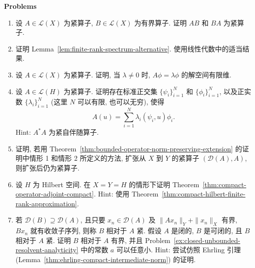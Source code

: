 \textbf{Problems}

\begin{enumerate}[label=\thesection.\arabic*.,ref=\thesection.\arabic*,start=39,series=book-problems]

\item\label{ex:bounded-compact-operator-products} 设 $A\in\mathcal{L}(X)$ 为紧算子, $B\in\mathcal{L}(X)$ 为有界算子. 证明 $AB$ 和 $BA$ 为紧算子.

\item\label{ex:finite-rank-spectrum-alternative-proof} 证明 Lemma~\ref{lem:finite-rank-spectrum-alternative}. 使用线性代数中的适当结果.

\item\label{ex:compact-nonzero-eigenspace-finite-dimensional} 设 $A\in\mathcal{L}(X)$ 为紧算子. 证明, 当 $\lambda\ne0$ 时, $A\phi=\lambda\phi$ 的解空间有限维.

\item\label{ex:compact-operator-singular-system-expansion} 设 $A\in\mathcal{L}(H)$ 为紧算子. 证明存在标准正交集 $\{\psi_i\}_{i=1}^N$ 和 $\{\phi_i\}_{i=1}^N$, 以及正实数 $\{\lambda_i\}_{i=1}^N$ (这里 $N$ 可以有限, 也可以无穷), 使得
\begin{equation}\label{eq:compact-operator-singular-system-problem}
A(u)=\sum_{i=1}^N\lambda_i(\psi_i,u)\phi_i.
\end{equation}
Hint: $A^*A$ 为紧自伴随算子.

\item\label{ex:compact-operator-norm-preserving-extension} 证明, 若用 Theorem~\ref{thm:bounded-operator-norm-preserving-extension} 的证明中情形 1 和情形 2 所定义的方法, 扩张从 $X$ 到 $Y$ 的紧算子 $(\mathcal{D}(A),A)$, 则扩张后仍为紧算子.

\item\label{ex:compact-adjoint-hilbert-proof} 设 $H$ 为 Hilbert 空间. 在 $X=Y=H$ 的情形下证明 Theorem~\ref{thm:compact-operator-adjoint-compact}. Hint: 使用 Theorem~\ref{thm:compact-hilbert-finite-rank-approximation}.

\item\label{ex:relative-compactness-arbitrarily-small-relative-bound} 若 $\mathcal{D}(B)\supseteq\mathcal{D}(A)$, 且只要 $x_n\in\mathcal{D}(A)$ 及 $\|Ax_n\|_Y+\|x_n\|_X$ 有界, $Bx_n$ 就有收敛子序列, 则称 $B$ 相对于 $A$ 紧. 假设 $A$ 是闭的, $B$ 是可闭的, 且 $B$ 相对于 $A$ 紧. 证明 $B$ 相对于 $A$ 有界, 并且 Problem~\ref{ex:closed-unbounded-resolvent-analyticity} 中的常数 $a$ 可以任意小. Hint: 尝试仿照 Ehrling 引理 (Lemma~\ref{thm:ehrling-compact-intermediate-norm}) 的证明.


\end{enumerate}
